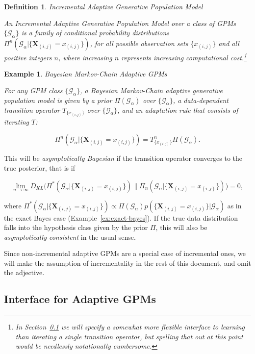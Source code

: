 \documentclass[10pt,letterpaper]{article}
\newtheorem{example}{Example}[section]
\newtheorem{definition}{Definition}[section]
\newcommand{\set}[1]{\{#1\}}
\newcommand{\G}{\mathcal{G}}
\newcommand{\T}{T}
\begin{document}
\begin{definition} Incremental Adaptive Generative Population Model
\label{def:incremental-adaptive}

An \emph{Incremental Adaptive Generative Population Model} over a
class of GPMs $\{\G_\alpha\}$ is a family of conditional probability
distributions $\Pi^n(\G_\alpha|\set{\mathbf{X}_{(i,j)} = x_{(i,j)}})$, for all
possible observation sets $\{x_{(i,j)}\}$ and all positive integers $n$,
where increasing $n$ represents increasing computational
cost.\footnote{In Section~\ref{sec:adaptive_gpm} we will specify a
  somewhat more flexible interface to learning than iterating a single
  transition operator, but spelling that out at this point would be
  needlessly notationally cumbersome.}
\end{definition}

\begin{example} Bayesian Markov-Chain Adaptive GPMs
\label{ex:markov-bayes}

For any GPM class $\{\G_\alpha\}$, a \emph{Bayesian Markov-Chain adaptive
  generative population model} is given by a prior
$\Pi(\G_\alpha)$ over
$\{\G_\alpha\}$, a data-dependent transition operator
$\T_{\{x_{(i,j)}\}}$ over $\{\G_\alpha\}$, and
an adaptation rule that consists of iterating $\T$:

\[ \Pi^n(\G_\alpha|\set{\mathbf{X}_{(i,j)} = x_{(i,j)}}) = 
\T_{\set{x_{(i,j)}}}^n \Pi(\G_\alpha). \]
\end{example}

This will be \emph{asymptotically Bayesian} if the transition operator
converges to the true posterior, that is if

\[ \lim_{n\to\infty}D_{KL}\Big(\Pi^*(\G_\alpha|\set{\mathbf{X}_{(i,j)} = 
x_{(i,j)}}) \Big\| \Pi_n(\G_\alpha|\set{\mathbf{X}_{(i,j)} = x_{(i,j)}})\Big) = 
0, 
\]

where $\Pi^*(\G_\alpha|\set{\mathbf{X}_{(i,j)}=x_{(i,j)}}) \propto 
\Pi(\G_\alpha) p(\set{\mathbf{X}_{(i,j)}=x_{(i,j)}}|\G_\alpha)$
as in the exact Bayes case (Example~\ref{ex:exact-bayes}).
If the true data distribution falls into the hypothesis class given by
the prior $\Pi$, this will also be \emph{asymptotically consistent} in
the usual sense.

Since non-incremental adaptive GPMs are a special case of incremental
ones, we will make the assumption of incrementality in the rest of
this document, and omit the adjective.

\subsection{Interface for Adaptive GPMs}
\label{sec:adaptive_gpm}
\end{document}
